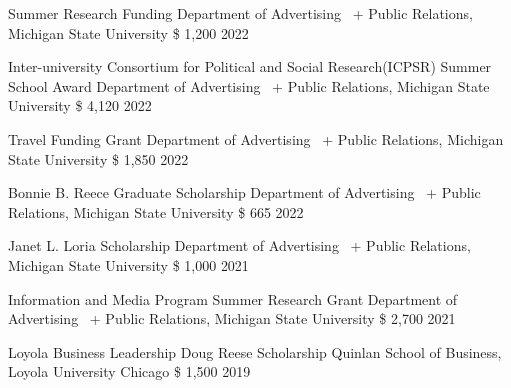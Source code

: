\begin{cvhonors}
    \cvhonor
    {Summer Research Funding} %
    {Department of Advertising \ +  Public Relations, Michigan State University} %
    {\$ 1,200} %
    {2022} %
    
    \cvhonor
    {Inter-university Consortium for Political and Social Research(ICPSR) Summer School Award} %
    {Department of Advertising \ +  Public Relations, Michigan State University} %
    {\$ 4,120} %
    {2022} %
    
    \cvhonor
    {Travel Funding Grant} %
    {Department of Advertising \ +  Public Relations, Michigan State University} %
    {\$ 1,850} %
    {2022} %
    
    \cvhonor
    {Bonnie B. Reece Graduate Scholarship} %
    {Department of Advertising \ +  Public Relations, Michigan State University} %
    {\$ 665} %
    {2022} %
    
    \cvhonor
    {Janet L. Loria Scholarship} %
    {Department of Advertising \ +  Public Relations, Michigan State University} %
    {\$ 1,000} %
    {2021} %

  \cvhonor
    {Information and Media Program Summer Research Grant} 
    {Department of Advertising \ +  Public Relations,
    Michigan State University } 
    {\$ 2,700} 
    {2021} 

    \cvhonor
    {Loyola Business Leadership Doug Reese Scholarship} %
    {Quinlan School of Business, Loyola University Chicago} %
    {\$ 1,500} %
    {2019} %


\end{cvhonors}

